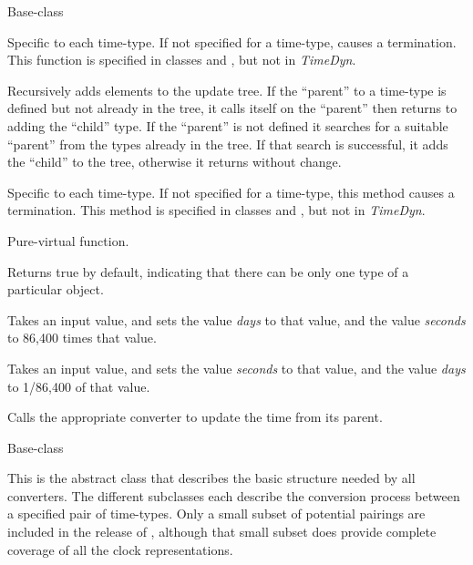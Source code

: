 {\begin{enumerate}

\label{ref:Time} Base-class

{\begin{enumerate}

\label{ref:addtypeinitialize}Specific to each time-type.  If not
specified for a time-type, causes a termination.  This function is
specified in classes  and 
, but
not in \textit{TimeDyn}.

Recursively adds elements to the update tree. If the
``parent'' to a time-type is defined but not
already in the tree, it calls itself on the
``parent'' then returns to adding the
``child'' type. If the
``parent'' is not defined it searches for a
suitable ``parent'' from the types already in
the tree.  If that search is successful, it adds the
``child'' to the tree, otherwise it returns
without change.

Specific to each time-type.  If not specified for a time-type, this method 
causes a
termination.  This method is specified in classes 
 and , 
but not in \textit{TimeDyn}.

Pure-virtual function.

Returns true by default, indicating that there can be only one type of a
particular object.

Takes an input value, and sets the value \textit{days }to that value,
and the value \textit{seconds} to 86,400 times that value.

Takes an input value, and sets the value \textit{seconds} to that value,
and the value \textit{days} to 1/86,400 of that value.

Calls the appropriate converter to update the time from its parent.

\end{enumerate}}


 \label{ref:TimeConverter} Base-class

This is the abstract class that describes the basic structure needed by all
converters.  The different subclasses each describe the conversion process 
between a
specified pair of time-types.  Only a small subset of potential
pairings are included in the release of \JEODid, although that small
subset does provide complete coverage of all the clock representations.




\end{enumerate}}
